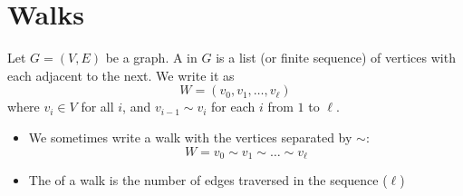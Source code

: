 \documentclass
[ignorenonframetext,aspectratio=169]
{ngelessonslides}
\begin{document}

\tableofcontents


\section{Walks}

\begin{frame}[label=walk-def]
\begin{definition}
    Let $G=(V,E)$ be a graph.
    A  in $G$ is a list (or finite sequence) of vertices
    with each adjacent to the next.  We write it as
    \[
        W = (v_0,v_1,\dots,v_\ell)
    \]
    where $v_i \in V$ for all $i$, and $v_{i-1} \sim v_i$ for each $i$ from $1$ to $\ell$.
\end{definition}
\begin{itemize}
\item We sometimes write a walk with the vertices separated by $\sim$:
\[
    W = v_0 \sim v_1 \sim \dots \sim v_\ell
\]
\item The  of a walk is the number of edges traversed in the sequence
($\ell$)
\end{itemize}
\end{frame}
\end{document}
